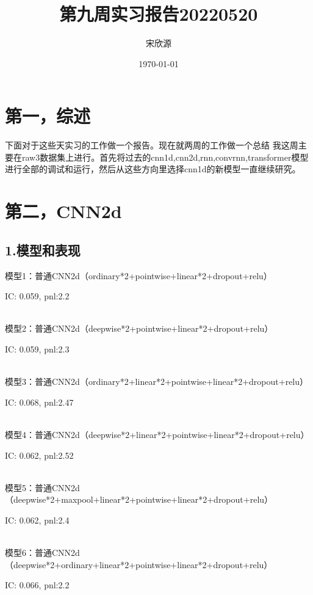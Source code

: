 \documentclass[11pt]{ctexart}
\begin{document}
\title{第九周实习报告20220520}
\author{宋欣源}
\date{\today}

\maketitle %


\section{第一，综述}

下面对于这些天实习的工作做一个报告。现在就两周的工作做一个总结
我这周主要在raw3数据集上进行。首先将过去的cnn1d,cnn2d,rnn,convrnn,transformer模型进行全部的调试和运行，然后从这些方向里选择cnn1d的新模型一直继续研究。

\section{第二，CNN2d}
\subsection{1.模型和表现}

模型1：普通CNN2d（ordinary*2+pointwise+linear*2+dropout+relu）

{\kaishu \small IC: 0.059, pnl:2.2}

~\\
模型2：普通CNN2d（deepwise*2+pointwise+linear*2+dropout+relu）

{\kaishu \small IC: 0.059, pnl:2.3}


~\\
模型3：普通CNN2d（ordinary*2+linear*2+pointwise+linear*2+dropout+relu）

{\kaishu \small IC: 0.068, pnl:2.47}


~\\
模型4：普通CNN2d（deepwise*2+linear*2+pointwise+linear*2+dropout+relu）

{\kaishu \small IC: 0.062, pnl:2.52}


~\\
模型5：普通CNN2d（deepwise*2+maxpool+linear*2+pointwise+linear*2+dropout+relu）

{\kaishu \small IC: 0.062, pnl:2.4}


~\\
模型6：普通CNN2d（deepwise*2+ordinary+linear*2+pointwise+linear*2+dropout+relu）

{\kaishu \small IC: 0.066, pnl:2.2}
\end{document}
